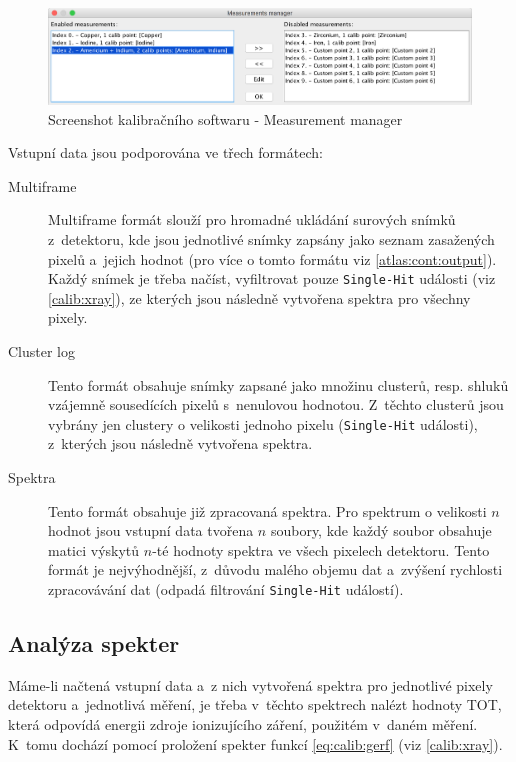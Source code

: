 \begin{figure}[th!]
	\begin{center}
		\includegraphics[width=15cm]{figures/calibsw_manager.png}
		\caption{Screenshot kalibračního softwaru - Measurement manager}
		\label{fig:calib:sw_measurmanag}
	\end{center}
\end{figure}

Vstupní data jsou podporována ve třech formátech:
\begin{description}
	\item[Multiframe] Multiframe formát slouží pro hromadné ukládání surových snímků z~detektoru, kde jsou jednotlivé snímky zapsány jako seznam zasažených pixelů a~jejich hodnot (pro více o tomto formátu viz \ref{atlas:cont:output}). Každý snímek je třeba načíst, vyfiltrovat pouze \texttt{Single-Hit} události (viz \ref{calib:xray}), ze kterých jsou následně vytvořena spektra pro všechny pixely.
	\item[Cluster log] Tento formát obsahuje snímky zapsané jako množinu clusterů, resp. shluků vzájemně sousedících pixelů s~nenulovou hodnotou. Z~těchto clusterů jsou vybrány jen clustery o velikosti jednoho pixelu (\texttt{Single-Hit} události), z~kterých jsou následně vytvořena spektra.
	\item[Spektra] Tento formát obsahuje již zpracovaná spektra. Pro spektrum o velikosti $n$ hodnot jsou vstupní data tvořena $n$ soubory, kde každý soubor obsahuje matici výskytů $n$-té hodnoty spektra ve všech pixelech detektoru. Tento formát je nejvýhodnější, z~důvodu malého objemu dat a~zvýšení rychlosti zpracovávání dat (odpadá filtrování \texttt{Single-Hit} událostí).
\end{description}


\subsection{Analýza spekter}\label{calib:sw:spektra}
Máme-li načtená vstupní data a~z nich vytvořená spektra pro jednotlivé pixely detektoru a~jednotlivá měření, je třeba v~těchto spektrech nalézt hodnoty TOT, která odpovídá energii zdroje ionizujícího záření, použitém v~daném měření. K~tomu dochází pomocí proložení spekter funkcí \ref{eq:calib:gerf} (viz \ref{calib:xray}). 

